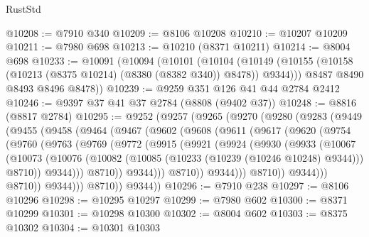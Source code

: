 \begin{lexlean}{RustStd}
\begin{coremodule}
@10208 := @7910 @340
@10209 := @8106 @10208
@10210 := @10207 @10209
@10211 := @7980 @698
@10213 := @10210 (@8371 @10211)
@10214 := @8004 @698
@10233 := @10091
    (@10094
      (@10101
        (@10104 (@10149 (@10155 (@10158 (@10213 (@8375 @10214) (@8380 (@8382 @340)) @8478)) @9344)))
        @8487
        @8490
        @8493
        @8496
        @8478))
@10239 := @9259 @351 @126 @41 @44 @2784 @2412
@10246 := @9397 @37 @41 @37 @2784 (@8808 (@9402 @37))
@10248 := @8816 (@8817 @2784)
@10295 := @9252
    (@9257
      (@9265
        (@9270
          (@9280
            (@9283
              (@9449
                (@9455
                  (@9458
                    (@9464
                      (@9467
                        (@9602
                          (@9608
                            (@9611
                              (@9617
                                (@9620
                                  (@9754
                                    (@9760
                                      (@9763
                                        (@9769
                                          (@9772
                                            (@9915
                                              (@9921
                                                (@9924
                                                  (@9930
                                                    (@9933
                                                      (@10067
                                                        (@10073
                                                          (@10076
                                                            (@10082
                                                              (@10085
                                                                (@10233
                                                                  (@10239 (@10246 @10248) @9344)))
                                                              @8710))
                                                          @9344)))
                                                    @8710))
                                                @9344)))
                                          @8710))
                                      @9344)))
                                @8710))
                            @9344)))
                      @8710))
                  @9344)))
            @8710))
        @9344))
@10296 := @7910 @238
@10297 := @8106 @10296
@10298 := @10295 @10297
@10299 := @7980 @602
@10300 := @8371 @10299
@10301 := @10298 @10300
@10302 := @8004 @602
@10303 := @8375 @10302
@10304 := @10301 @10303

\end{coremodule}
\end{lexlean}

